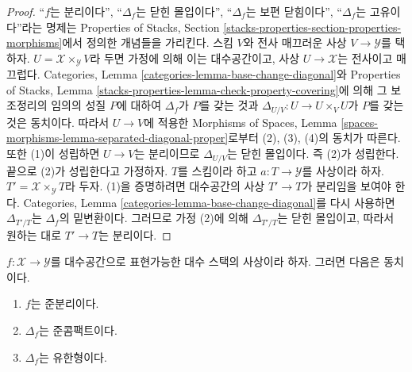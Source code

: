 \begin{proof}
``$f$는 분리이다'', ``$\Delta_f$는 닫힌 몰입이다'',
``$\Delta_f$는 보편 닫힘이다'', ``$\Delta_f$는 고유이다''라는 명제는
Properties of Stacks, Section
\ref{stacks-properties-section-properties-morphisms}에서 정의한
개념들을 가리킨다. 스킴 $V$와 전사 매끄러운 사상
$V \to \mathcal{Y}$를 택하자.
$U = \mathcal{X} \times_\mathcal{Y} V$라 두면 가정에 의해 이는
대수공간이고, 사상 $U \to \mathcal{X}$는 전사이고 매끄럽다.
Categories, Lemma \ref{categories-lemma-base-change-diagonal}와
Properties of Stacks, Lemma
\ref{stacks-properties-lemma-check-property-covering}에 의해
그 보조정리의 임의의 성질 $P$에 대하여 $\Delta_f$가 $P$를 갖는 것과
$\Delta_{U/V} : U \to U \times_V U$가 $P$를 갖는 것은 동치이다.
따라서 $U \to V$에 적용한 Morphisms of Spaces, Lemma
\ref{spaces-morphisms-lemma-separated-diagonal-proper}로부터
(2), (3), (4)의 동치가 따른다.
또한 (1)이 성립하면 $U \to V$는 분리이므로 $\Delta_{U/V}$는
닫힌 몰입이다. 즉 (2)가 성립한다.
끝으로 (2)가 성립한다고 가정하자. $T$를 스킴이라 하고
$a : T \to \mathcal{Y}$를 사상이라 하자.
$T' = \mathcal{X} \times_\mathcal{Y} T$라 두자.
(1)을 증명하려면 대수공간의 사상 $T' \to T$가 분리임을 보여야 한다.
Categories, Lemma \ref{categories-lemma-base-change-diagonal}를
다시 사용하면 $\Delta_{T'/T}$는 $\Delta_f$의 밑변환이다.
그러므로 가정 (2)에 의해 $\Delta_{T'/T}$는 닫힌 몰입이고,
따라서 원하는 대로 $T' \to T$는 분리이다.
\end{proof}

\begin{lemma}
\label{lemma-representable-quasi-separated-diagonal-quasi-compact}
$f : \mathcal{X} \to \mathcal{Y}$를 대수공간으로 표현가능한
대수 스택의 사상이라 하자. 그러면 다음은 동치이다.
\begin{enumerate}
\item $f$는 준분리이다.
\item $\Delta_f$는 준콤팩트이다.
\item $\Delta_f$는 유한형이다.
\end{enumerate}
\end{lemma}

